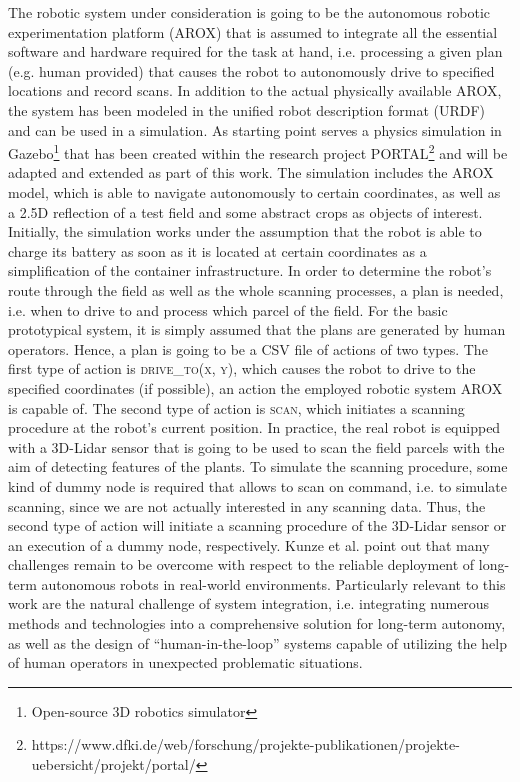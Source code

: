 \documentclass[english, master, expose, utf8]{base/thesis_KBS}
\begin{document}
The robotic system under consideration is going to be the autonomous robotic experimentation platform (AROX) \cite{Kisliuk:2021} that is assumed to integrate 
all the essential software and hardware required for the task at hand, i.e. processing a given plan (e.g. human provided) that causes the robot to autonomously
drive to specified locations and record scans. In addition to the actual physically available AROX, the system has been modeled in the unified robot description 
format (URDF) and can be used in a simulation. As starting point serves a physics simulation in Gazebo\footnote{Open-source 3D robotics simulator} that 
has been created within the research project PORTAL\footnote{https://www.dfki.de/web/forschung/projekte-publikationen/projekte-uebersicht/projekt/portal/} and will be
adapted and extended as part of this work. The simulation includes the AROX model, which is able to navigate autonomously to certain coordinates, as well as a 2.5D 
reflection of a test field and some abstract crops as objects of interest. Initially, the simulation works under the assumption that the robot is able to charge its 
battery as soon as it is located at certain coordinates as a simplification of the container infrastructure.
In order to determine the robot's route through the field as well as the whole scanning processes, a plan is needed, i.e. when to drive to and process which parcel of the field. 
For the basic prototypical system, it is simply assumed that the plans are generated by human operators. Hence, a plan is going to be a CSV file of actions of two types.
The first type of action is \textsc{drive\_to(x, y)}, which causes the robot to drive to the specified coordinates (if possible), an action the employed robotic system 
AROX is capable of. The second type of action is \textsc{scan}, which initiates a scanning procedure at the robot's current position.
In practice, the real robot is equipped with a 3D-Lidar sensor that is going to be used to scan the field parcels with the aim of detecting features of the plants. 
To simulate the scanning procedure, some kind of dummy node is required that allows to scan on command, i.e. to simulate scanning, since we are not actually interested
in any scanning data. Thus, the second type of action will initiate a scanning procedure of the 3D-Lidar sensor or an execution of a dummy node, respectively.\newline
Kunze et al. point out that many challenges remain to be overcome with respect to the reliable deployment of long-term autonomous robots in real-world environments.
Particularly relevant to this work are the natural challenge of system integration, i.e. integrating numerous methods and technologies into a comprehensive solution 
for long-term autonomy, as well as the design of ``human-in-the-loop'' systems capable of utilizing the help of human operators in unexpected problematic situations. \cite{Kunze:2018}
\end{document}

